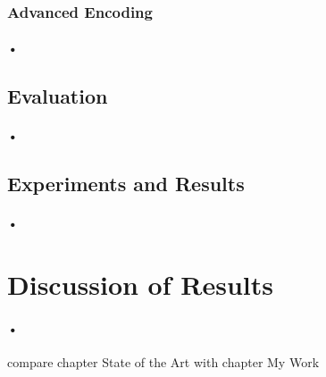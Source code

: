 \documentclass{article}
\begin{document}
\subsubsection{Advanced Encoding}
\paragraph*{•}

\subsection{Evaluation}
\paragraph*{•}
\subsection{Experiments and Results}
\paragraph*{•}
\newpage
\section{Discussion of Results}
\paragraph*{•}
compare chapter State of the Art with chapter My Work \cite{LifschitzASP}
\end{document}
